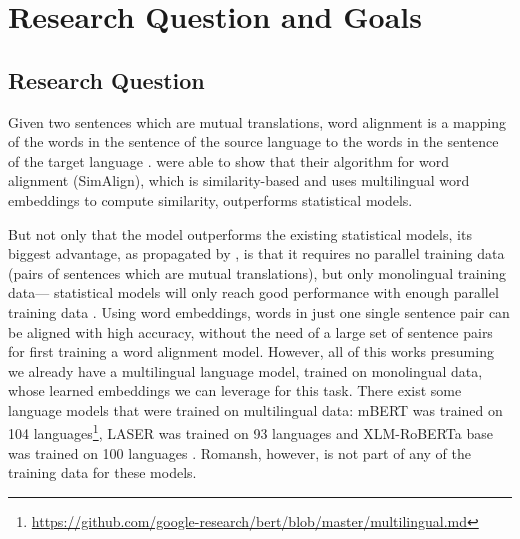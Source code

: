 


\section{Research Question and Goals}
\subsection{Research Question}\label{sec:research-question}
Given two sentences which are mutual translations, word alignment is a mapping of the words in the sentence of the source language to the words in the sentence of the target language \autocite[84]{koehn2009}.
\cite{jalili-sabet-etal-2020-simalign} were able to show that their algorithm for word alignment (SimAlign), which is similarity-based and uses multilingual word embeddings to compute similarity, outperforms statistical models. 

But not only that the model outperforms the existing statistical models, its biggest advantage, as propagated by \cite{jalili-sabet-etal-2020-simalign}, is that it requires no parallel training data (pairs of sentences which are mutual translations), but only monolingual training data--- 
statistical models will only reach good performance with enough parallel training data \autocites{jalili-sabet-etal-2020-simalign,och-ney-2000-improved}. 
Using word embeddings, words in just one single sentence pair can be aligned with high accuracy, without the need of a large set of sentence pairs for first training a word alignment model.
However, all of this works presuming we already have  a multilingual language model, trained on monolingual data, whose learned embeddings we can leverage for this task. 
There exist some language models that were trained on multilingual data: 
mBERT was trained on 104 languages\footnote{\url{https://github.com/google-research/bert/blob/master/multilingual.md}}, LASER was trained on 93 languages \autocite{artexte-schwenk-2019-laser} and XLM-RoBERTa base was trained on 100 languages \autocite{conneau-etal-2020-xlm}. Romansh, however, is not part of any of the training data for these models.




